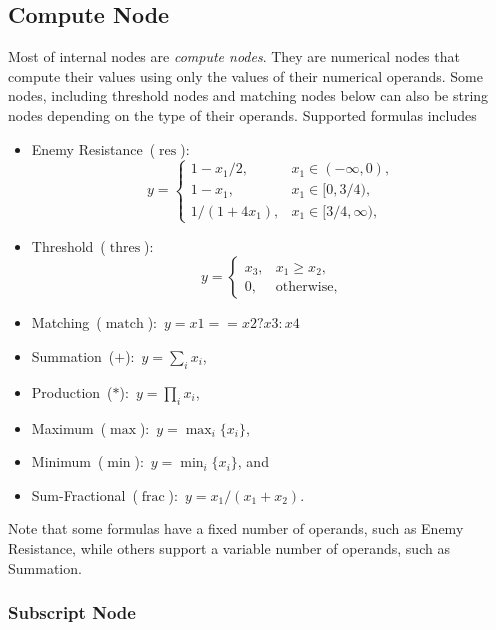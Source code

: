 \documentclass{article}
\DeclareMathOperator{\resNode}{res}
\DeclareMathOperator{\fracNode}{frac}
\DeclareMathOperator{\thresholdNode}{thres}
\DeclareMathOperator{\matchingNode}{match}
\begin{document}
\subsection{Compute Node}

Most of internal nodes are \emph{compute nodes}.
They are numerical nodes that compute their values using only the values of their numerical operands.
Some nodes, including threshold nodes and matching nodes below can also be string nodes depending on the type of their operands.
Supported formulas includes
%
\begin{itemize}
	\item Enemy Resistance~($\resNode$):
	      \begin{equation*}
		      y = \begin{cases}
			      1 - x_1/2,    & x_1 \in (-\infty, 0),  \\
			      1 - x_1,      & x_1 \in [0, 3/4),      \\
			      1/(1 + 4x_1), & x_1 \in [3/4, \infty),
		      \end{cases}
	      \end{equation*}
	\item Threshold~($\thresholdNode$):
	      \begin{equation*}
		      y = \begin{cases}
			      x_3, & x_1 \ge x_2,      \\
			      0,   & \text{otherwise},
		      \end{cases}
	      \end{equation*}
	\item Matching~($\matchingNode$):~$y = x1 == x2 ? x3 : x4$
	\item Summation~($+$):~$y = \sum_i x_i$,
	\item Production~($*$):~$y = \prod_i x_i$,
	\item Maximum~($\max$):~$y = \max_i\{ x_i \}$,
	\item Minimum~($\min$):~$y = \min_i\{ x_i \}$, and
	\item Sum-Fractional~($\fracNode$):~$y = {x_1} / (x_1 + x_2)$.
\end{itemize}
%
Note that some formulas have a fixed number of operands, such as Enemy Resistance, while others support a variable number of operands, such as Summation.

\subsubsection{Subscript Node}
\end{document}
